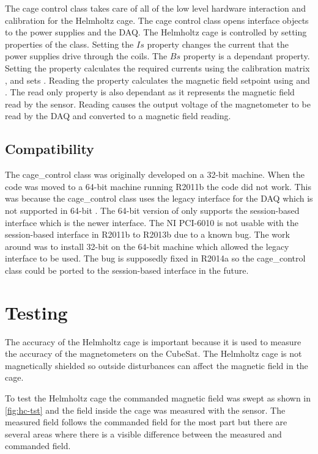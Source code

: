 The cage control class takes care of all of the low level hardware interaction and calibration for the Helmholtz cage. The cage control class opens interface objects to the power supplies and the \ac{DAQ}. The Helmholtz cage is controlled by setting properties of the class. Setting the \lstMat$Is$ property changes the current that the power supplies drive through the coils. The \lstMat$Bs$ property is a dependant property. Setting the  property calculates the required currents using the calibration matrix , and sets . Reading the  property calculates the magnetic field setpoint using  and . The read only  property is also dependant as it represents the magnetic field read by the sensor. Reading  causes the output voltage of the magnetometer to be read by the \ac{DAQ} and converted to a magnetic field reading.

\subsection{Compatibility}

The cage\_control class was originally developed on a 32-bit machine. When the code was moved to a 64-bit machine running \matlab R2011b the code did not work. This was because the cage\_control class uses the legacy interface for the \ac{DAQ} which is not supported in 64-bit \matlab. The 64-bit version of \matlab only supports the session-based interface which is the newer interface. The NI PCI-6010 is not usable with the session-based interface in \matlab R2011b to R2013b due to a known bug. The work around was to install 32-bit \matlab on the 64-bit machine which allowed the legacy interface to be used. The bug is supposedly fixed in \matlab R2014a so the cage\_control class could be ported to the session-based interface in the future.

\section{Testing}

The accuracy of the Helmholtz cage is important because it is used to measure the accuracy of the magnetometers on the CubeSat. The Helmholtz cage is not magnetically shielded so outside disturbances can affect the magnetic field in the cage.

To test the Helmholtz cage the commanded magnetic field was swept as shown in \cref{fig:hc-tst} and the field inside the cage was measured with the sensor. The measured field follows the commanded field for the most part but there are several areas where there is a visible difference between the measured and commanded field. 


